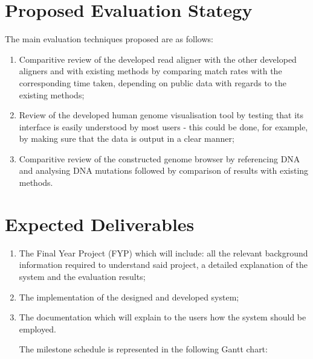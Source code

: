 \documentclass{csfyp}
\begin{document}
{{\section{Proposed Evaluation Stategy}

The main evaluation techniques proposed are as follows:

\begin{enumerate}[nolistsep]

  \item	Comparitive review of the developed read aligner with the other developed aligners and with existing methods by comparing match rates with the corresponding time taken, depending on public data with regards to the existing methods;

  \item Review of the developed human genome visualisation tool by testing that its interface is easily understood by most users - this could be done, for example, by making sure that the data is output in a clear manner;

  \item Comparitive review of the constructed genome browser by referencing DNA and analysing DNA mutations followed by comparison of results with existing methods.

\end{enumerate}


\section{Expected Deliverables}

\begin{enumerate}[nolistsep]

  \item The Final Year Project (FYP) which will include: all the relevant background information required to understand said project, a detailed explanation of the system and the evaluation results; 

  \item The implementation of the designed and developed system;

  \item The documentation which will explain to the users how the system should be employed. 

The milestone schedule is represented in the following Gantt chart: \\


\end{enumerate}}}
\end{document}
